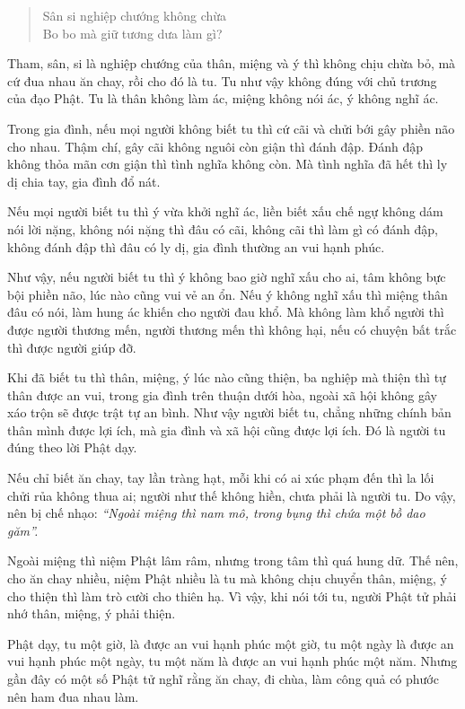 \documentclass[
  12pt,
  oneside]{book}
\begin{document}
\begin{quote}
Sân si nghiệp chướng không chừa\\
Bo bo mà giữ tương dưa làm gì?
\end{quote}

Tham, sân, si là nghiệp chướng của thân, miệng và ý thì không chịu chừa bỏ, mà cứ đua nhau ăn chay, rồi cho đó là tu. Tu như vậy không đúng với chủ trương của đạo Phật. Tu là thân không làm ác, miệng không nói ác, ý không nghĩ ác.

Trong gia đình, nếu mọi người không biết tu thì cứ cãi và chửi bới gây phiền não cho nhau. Thậm chí, gây cãi không nguôi còn giận thì đánh đập. Đánh đập không thỏa mãn cơn giận thì tình nghĩa không còn. Mà tình nghĩa đã hết thì ly dị chia tay, gia đình đổ nát.

Nếu mọi người biết tu thì ý vừa khởi nghĩ ác, liền biết xấu chế ngự không dám nói lời nặng, không nói nặng thì đâu có cãi, không cãi thì làm gì có đánh đập, không đánh đập thì đâu có ly dị, gia đình thường an vui hạnh phúc.

Như vậy, nếu người biết tu thì ý không bao giờ nghĩ xấu cho ai, tâm không bực bội phiền não, lúc nào cũng vui vẻ an ổn. Nếu ý không nghĩ xấu thì miệng thân đâu có nói, làm hung ác khiến cho người đau khổ. Mà không làm khổ người thì được người thương mến, người thương mến thì không hại, nếu có chuyện bất trắc thì được người giúp đỡ.

Khi đã biết tu thì thân, miệng, ý lúc nào cũng thiện, ba nghiệp mà thiện thì tự thân được an vui, trong gia đình trên thuận dưới hòa, ngoài xã hội không gây xáo trộn sẽ được trật tự an bình. Như vậy người biết tu, chẳng những chính bản thân mình được lợi ích, mà gia đình và xã hội cũng được lợi ích. Đó là người tu đúng theo lời Phật dạy.

Nếu chỉ biết ăn chay, tay lần tràng hạt, mỗi khi có ai xúc phạm đến thì la lối chửi rủa không thua ai; người như thế không hiền, chưa phải là người tu. Do vậy, nên bị chế nhạo: \emph{``Ngoài miệng thì nam mô, trong bụng thì chứa một bồ dao găm''.}

Ngoài miệng thì niệm Phật lâm râm, nhưng trong tâm thì quá hung dữ. Thế nên, cho ăn chay nhiều, niệm Phật nhiều là tu mà không chịu chuyển thân, miệng, ý cho thiện thì làm trò cười cho thiên hạ. Vì vậy, khi nói tới tu, người Phật tử phải nhớ thân, miệng, ý phải thiện.

Phật dạy, tu một giờ, là được an vui hạnh phúc một giờ, tu một ngày là được an vui hạnh phúc một ngày, tu một năm là được an vui hạnh phúc một năm. Nhưng gần đây có một số Phật tử nghĩ rằng ăn chay, đi chùa, làm công quả có phước nên ham đua nhau làm.
\end{document}
